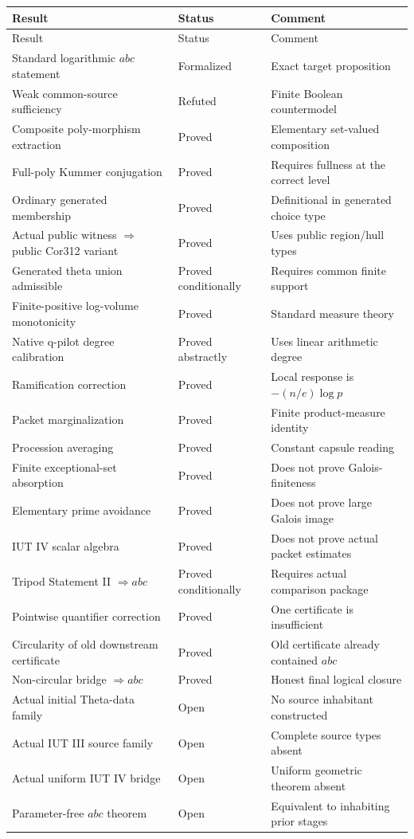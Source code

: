 \documentclass[11pt]{amsart}
\theoremstyle{definition}
\theoremstyle{remark}
\begin{document}
\begin{longtable}{@{}p{}p{}p{}@{}}
\toprule
Result & Status & Comment\\
\midrule
\endfirsthead
\toprule
Result & Status & Comment\\
\midrule
\endhead
Standard logarithmic $abc$ statement & Formalized & Exact target proposition\\
Weak common-source sufficiency & Refuted & Finite Boolean countermodel\\
Composite poly-morphism extraction & Proved & Elementary set-valued composition\\
Full-poly Kummer conjugation & Proved & Requires fullness at the correct level\\
Ordinary generated membership & Proved & Definitional in generated choice type\\
Actual public witness $\Rightarrow$ public Cor312 variant & Proved & Uses public region/hull types\\
Generated theta union admissible & Proved conditionally & Requires common finite support\\
Finite-positive log-volume monotonicity & Proved & Standard measure theory\\
Native q-pilot degree calibration & Proved abstractly & Uses linear arithmetic degree\\
Ramification correction & Proved & Local response is $-(n/e)\log p$\\
Packet marginalization & Proved & Finite product-measure identity\\
Procession averaging & Proved & Constant capsule reading\\
Finite exceptional-set absorption & Proved & Does not prove Galois-finiteness\\
Elementary prime avoidance & Proved & Does not prove large Galois image\\
IUT IV scalar algebra & Proved & Does not prove actual packet estimates\\
Tripod Statement II $\Rightarrow abc$ & Proved conditionally & Requires actual comparison package\\
Pointwise quantifier correction & Proved & One certificate is insufficient\\
Circularity of old downstream certificate & Proved & Old certificate already contained $abc$\\
Non-circular bridge $\Rightarrow abc$ & Proved & Honest final logical closure\\
Actual initial Theta-data family & Open & No source inhabitant constructed\\
Actual IUT III source family & Open & Complete source types absent\\
Actual uniform IUT IV bridge & Open & Uniform geometric theorem absent\\
Parameter-free $abc$ theorem & Open & Equivalent to inhabiting prior stages\\
\bottomrule
\end{longtable}
\end{document}
